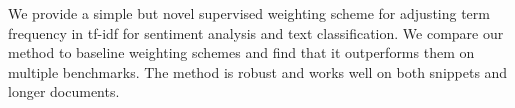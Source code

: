 We provide a simple but novel supervised weighting scheme for adjusting term frequency in tf-idf for sentiment analysis and text classification. We compare our method to baseline weighting schemes and find that it outperforms them on multiple benchmarks. The method is robust and works well on both snippets and longer documents.
